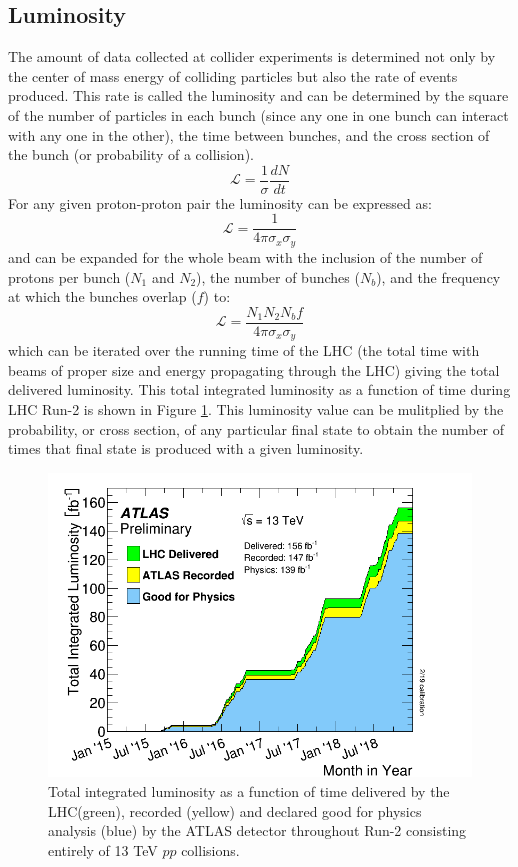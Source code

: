 \subsection{Luminosity}
The amount of data collected at collider experiments is determined not only by the center of mass energy of colliding particles but also the rate of events produced.  This rate is called the luminosity and can be determined by the square of the number of particles in each bunch (since any one in one bunch can interact with any one in the other), the time between bunches, and the cross section of the bunch (or probability of a collision).
\[ \mathcal{L}=\frac{1}{\sigma}\frac{dN}{dt} \]
For any given proton-proton pair the luminosity can be expressed as:
\[ \mathcal{L}=\frac{1}{4\pi \sigma_x \sigma_y} \]
and can be expanded for the whole beam with the inclusion of the number of protons per bunch ($N_1$ and $N_2$), the number of bunches ($N_b$), and the frequency at which the bunches overlap ($f$) to:
\[ \mathcal{L}=\frac{N_1 N_2 N_b f}{4 \pi \sigma_x \sigma_y} \]
which can be iterated over the running time of the LHC (the total time with beams of proper size and energy propagating through the LHC) giving the total delivered luminosity.  This total integrated luminosity as a function of time during LHC Run-2 is shown in Figure \ref{fig:ATLASLumi}.  This luminosity value can be mulitplied by the probability, or cross section, of any particular final state to obtain the number of times that final state is produced with a given luminosity.
\begin{figure}[ht!]
	\centering
	\includegraphics[width=.7\columnwidth]{../ThesisImages/LHCImages/ATLASLumi.png}
	\caption[Total integrated luminosity as a function of time delivered by the LHC(green), recorded (yellow) and declared good for physics analysis (blue) by the ATLAS detector throughout Run-2 consisting entirely of 13 TeV $pp$ collisions.]{Total integrated luminosity as a function of time delivered by the LHC(green), recorded (yellow) and declared good for physics analysis (blue) by the ATLAS detector throughout Run-2 consisting entirely of 13 TeV $pp$ collisions\cite{ATLASLumi}.}
	\label{fig:ATLASLumi}
\end{figure}


